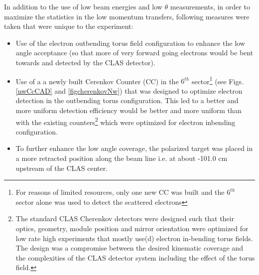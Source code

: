 In addition to the use of low beam energies and low $\theta$ measurements, in order to maximize the statistics in the low momentum transfers, following measures were taken that were unique to the experiment:
\begin{itemize}
\item Use of the electron outbending torus field configuration to enhance the low angle acceptance (so that more of very forward going electrons would be bent towards and detected by the CLAS detector).
\item Use of a a newly built Cerenkov Counter (CC) in the $6^{th}$ sector\footnote{For reasons of limited resources, only one new CC was built and the $6^{th}$ sector alone was used to detect the scattered electrons} (see Figs. \ref{nwCcCAD} and \ref{figcherenkovNw}) that was designed to optimize electron detection in the outbending torus configuration. %
This led to a better and more uniform %
  detection efficiency would be better and more uniform than with the existing counters\footnote{The standard CLAS Cherenkov detectors were designed such that their optics, geometry, module position and mirror orientation were optimized for low rate high \qsq experiments that mostly use(d) electron in-bending torus fields. The design was a compromise between the desired kinematic coverage and the complexities of the CLAS detector system including the effect of the torus field.} which were optimized for electron inbending configuration. 
\item To further enhance the low angle coverage, the polarized target was placed in a more retracted position along the beam line i.e. at about -101.0 cm upstream of the CLAS center.
\end{itemize}

